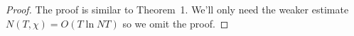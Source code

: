 \begin{proof}
The proof is similar to Theorem~1. We'll only need the weaker estimate $N(T,\chi)=O(T\ln NT)$ so we omit the proof.
%

\end{proof}
